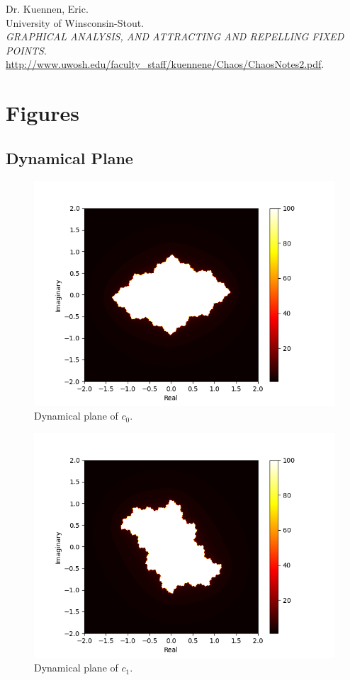 \documentclass[11pt]{article}
\begin{document}
\newpage
\begin{thebibliography}{X}
Dr. Kuennen, Eric.\\
University of Winsconsin-Stout.\\
\textit{GRAPHICAL ANALYSIS, AND ATTRACTING AND REPELLING FIXED POINTS}.\\
\url{http://www.uwosh.edu/faculty_staff/kuennene/Chaos/ChaosNotes2.pdf}.
\end{thebibliography}

\appendix
\section{Figures}

\subsection{Dynamical Plane}
\begin{figure}[ht]
    \centering
    \includegraphics{julia_set_-0.5_0.1.png}
    \caption{Dynamical plane of $c_0$.}
    \label{fig:1a}
\end{figure}
\begin{figure}[ht]
    \centering
    \includegraphics{julia_set_0.0_-0.5.png}
    \caption{Dynamical plane of $c_1$.}
    \label{fig:1b}
\end{figure}
\end{document}
